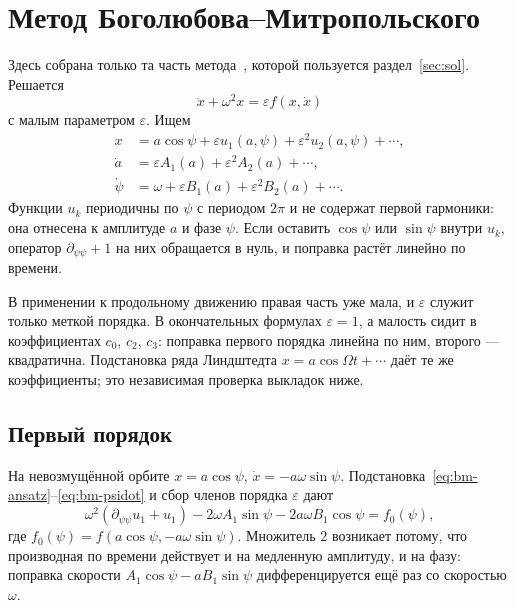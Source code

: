 \section{Метод Боголюбова--Митропольского}
\label{app:bm}

Здесь собрана только та часть метода~\cite{Bogoliubov1961}, которой пользуется раздел~\ref{sec:sol}. Решается
\begin{equation}
\label{eq:bm-eq}
\ddot x+\omega^2 x=\varepsilon f(x,\dot x)
\end{equation}
с малым параметром $\varepsilon$. Ищем
\begin{align}
x&=a\cos\psi+\varepsilon u_1(a,\psi)+\varepsilon^2 u_2(a,\psi)+\cdots,
\label{eq:bm-ansatz}\\
\dot a&=\varepsilon A_1(a)+\varepsilon^2 A_2(a)+\cdots,
\label{eq:bm-adot}\\
\dot\psi&=\omega+\varepsilon B_1(a)+\varepsilon^2 B_2(a)+\cdots.
\label{eq:bm-psidot}
\end{align}
Функции $u_k$ периодичны по $\psi$ с периодом $2\pi$ и не содержат первой гармоники: она отнесена к амплитуде $a$ и фазе $\psi$. Если оставить $\cos\psi$ или $\sin\psi$ внутри $u_k$, оператор $\partial_{\psi\psi}+1$ на них обращается в нуль, и поправка растёт линейно по времени.

В применении к продольному движению правая часть уже мала, и $\varepsilon$ служит только меткой порядка. В окончательных формулах $\varepsilon=1$, а малость сидит в коэффициентах $c_0$, $c_2$, $c_3$: поправка первого порядка линейна по ним, второго --- квадратична. Подстановка ряда Линдштедта $x=a\cos\Omega t+\cdots$ даёт те же коэффициенты; это независимая проверка выкладок ниже.

\subsection{Первый порядок}
\label{sec:bm-first}

На невозмущённой орбите $x=a\cos\psi$, $\dot x=-a\omega\sin\psi$. Подстановка~\eqref{eq:bm-ansatz}--\eqref{eq:bm-psidot} и сбор членов порядка $\varepsilon$ дают
\begin{equation}
\label{eq:bm-order1}
\omega^2(\partial_{\psi\psi}u_1+u_1)
-2\omega A_1\sin\psi
-2a\omega B_1\cos\psi
=f_0(\psi),
\end{equation}
где $f_0(\psi)=f(a\cos\psi,-a\omega\sin\psi)$. Множитель $2$ возникает потому, что производная по времени действует и на медленную амплитуду, и на фазу: поправка скорости $A_1\cos\psi-a B_1\sin\psi$ дифференцируется ещё раз со скоростью $\omega$.

